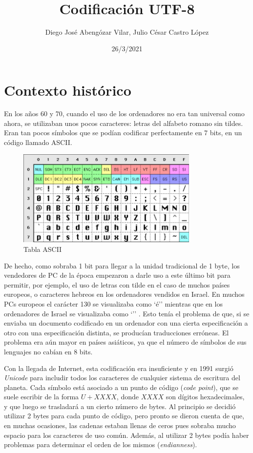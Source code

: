 \documentclass{article}
\title{\vspace{-2cm}\textbf{Codificación UTF-8}}
\author{Diego José Abengózar Vilar, Julio César Castro López}
\date{26/3/2021}
\begin{document}
\maketitle
\tableofcontents

\section{Contexto histórico}

En los años 60 y 70, cuando el uso de los ordenadores no era tan universal como
ahora, se utilizaban unos pocos caracteres: letras del alfabeto romano sin
tildes. Eran tan pocos símbolos que se podían codificar perfectamente en 7 bits,
en un código llamado ASCII.

\begin{figure}[h]
  \centering
  \includegraphics[width=0.8\textwidth]{ascii.jpeg}
  \caption{Tabla ASCII}
\end{figure}

De hecho, como sobraba 1 bit para llegar a la unidad tradicional de 1 byte, los
vendedores de PC de la época empezaron a darle uso a este último bit para
permitir, por ejemplo, el uso de letras con tilde en el caso de muchos países
europeos, o caracteres hebreos en los ordenadores vendidos en Israel. En muchos
PCs europeos el carácter 130 se visualizaba como `é'' mientras que en los
ordenadores de Israel se visualizaba como `'' \cite{historia}. Esto
tenía el problema de que, si se enviaba un documento codificado en un ordenador
con una cierta especificación a otro con una especificación distinta, se
producían traducciones erróneas. El problema era aún mayor en países asiáticos,
ya que el número de símbolos de sus lenguajes no cabían en 8 bits.

Con la llegada de Internet, esta codificación era insuficiente y en 1991 surgió
\textit{Unicode} para includir todos los caracteres de cualquier sistema de
escritura del planeta. Cada símbolo está asociado a un punto de código
(\textit{code point}), que se suele escribir de la forma $U+XXXX$, donde $XXXX$
son dígitos hexadecimales, y que luego se trasladará a un cierto número de
bytes. Al principio se decidió utilizar 2 bytes para cada punto de código, pero
pronto se dieron cuenta de que, en muchas ocasiones, las cadenas estaban llenas
de ceros pues sobraba mucho espacio para los caracteres de uso común. Además, al
utilizar 2 bytes podía haber problemas para determinar el orden de los mismos
(\textit{endianness}).
\end{document}
